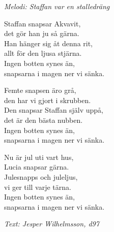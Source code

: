 {\footnotesize\textit{Melodi: Staffan var en stalledräng}}\par
\vspace{10pt}
Staffan snapsar Akvavit,\\
det gör han ju så gärna.\\
Han hänger sig åt denna rit,\\
allt för den ljusa stjärna.\\
Ingen botten synes än,\\
snapsarna i magen ner vi sänka.\par
\vspace{10pt}
Femte snapsen äro grå,\\
den har vi gjort i skrubben.\\
Den snapsar Staffan själv uppå,\\
det är den bästa nubben.\\
Ingen botten synes än,\\
snapsarna i magen ner vi sänka.\par
\vspace{10pt}
Nu är jul uti vart hus,\\
Lucia snapsar gärna.\\
Julesnapps och juleljus,\\
vi ger till varje tärna.\\
Ingen botten synes än,\\
snapsarna i magen ner vi sänka.\par
\vspace{10pt}
{\footnotesize\textit{Text: Jesper Wilhelmsson, d97}}
